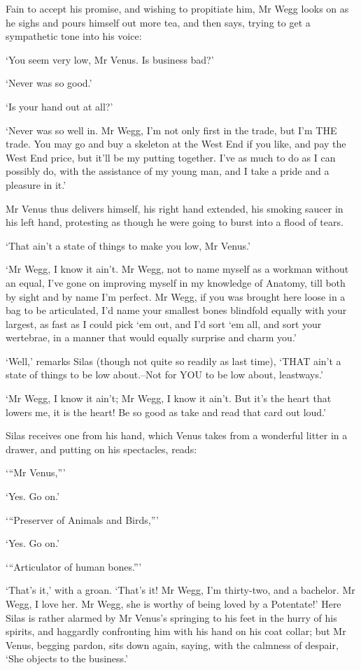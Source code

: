 Fain to accept his promise, and wishing to propitiate him, Mr Wegg looks
on as he sighs and pours himself out more tea, and then says, trying to
get a sympathetic tone into his voice:

‘You seem very low, Mr Venus. Is business bad?’

‘Never was so good.’

‘Is your hand out at all?’

‘Never was so well in. Mr Wegg, I’m not only first in the trade, but I’m
THE trade. You may go and buy a skeleton at the West End if you like,
and pay the West End price, but it’ll be my putting together. I’ve as
much to do as I can possibly do, with the assistance of my young man,
and I take a pride and a pleasure in it.’

Mr Venus thus delivers himself, his right hand extended, his smoking
saucer in his left hand, protesting as though he were going to burst
into a flood of tears.

‘That ain’t a state of things to make you low, Mr Venus.’

‘Mr Wegg, I know it ain’t. Mr Wegg, not to name myself as a workman
without an equal, I’ve gone on improving myself in my knowledge of
Anatomy, till both by sight and by name I’m perfect. Mr Wegg, if you was
brought here loose in a bag to be articulated, I’d name your smallest
bones blindfold equally with your largest, as fast as I could pick ‘em
out, and I’d sort ‘em all, and sort your wertebrae, in a manner that
would equally surprise and charm you.’

‘Well,’ remarks Silas (though not quite so readily as last time), ‘THAT
ain’t a state of things to be low about.--Not for YOU to be low about,
leastways.’

‘Mr Wegg, I know it ain’t; Mr Wegg, I know it ain’t. But it’s the heart
that lowers me, it is the heart! Be so good as take and read that card
out loud.’

Silas receives one from his hand, which Venus takes from a wonderful
litter in a drawer, and putting on his spectacles, reads:

‘“Mr Venus,”’

‘Yes. Go on.’

‘“Preserver of Animals and Birds,”’

‘Yes. Go on.’

‘“Articulator of human bones.”’

‘That’s it,’ with a groan. ‘That’s it! Mr Wegg, I’m thirty-two, and a
bachelor. Mr Wegg, I love her. Mr Wegg, she is worthy of being loved by
a Potentate!’ Here Silas is rather alarmed by Mr Venus’s springing to
his feet in the hurry of his spirits, and haggardly confronting him with
his hand on his coat collar; but Mr Venus, begging pardon, sits down
again, saying, with the calmness of despair, ‘She objects to the
business.’


